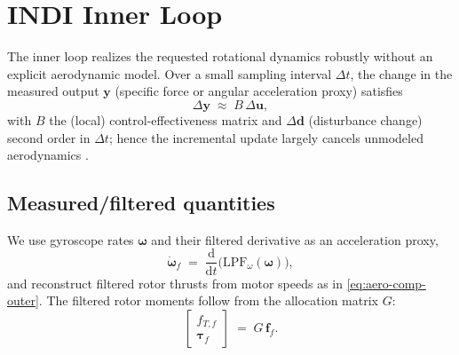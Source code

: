\section{INDI Inner Loop}\label{sec:indi}
The inner loop realizes the requested rotational dynamics robustly without an explicit
aerodynamic model. Over a small sampling interval $\Delta t$, the change in the measured
output $\mathbf{y}$ (specific force or angular acceleration proxy) satisfies
\begin{equation}
\Delta\mathbf{y} \;\approx\; B\,\Delta\mathbf{u},
\end{equation}
with $B$ the (local) control-effectiveness matrix and $\Delta\mathbf{d}$ (disturbance change)
second order in $\Delta t$; hence the incremental update largely cancels unmodeled
aerodynamics \cite{Smeur2016,Oosedo2017,vanKampen2018,Tzoumanikas2021}.

\subsection{Measured/filtered quantities}\label{sec:indi-sensed}
We use gyroscope rates $\boldsymbol{\omega}$ and their filtered derivative as an acceleration proxy,
\begin{equation}
\dot{\boldsymbol{\omega}}_f \;=\; \frac{\mathrm{d}}{\mathrm{d}t}\big(\mathrm{LPF}_\omega(\boldsymbol{\omega})\big),
\end{equation}
and reconstruct filtered rotor thrusts from motor speeds as in \eqref{eq:aero-comp-outer}. The
filtered rotor moments follow from the allocation matrix $G$:
\begin{equation}
\begin{bmatrix} f_{T,f}\\ \boldsymbol{\tau}_f \end{bmatrix} \;=\; G\,\mathbf{f}_f.
\label{eq:tau-f}
\end{equation}

